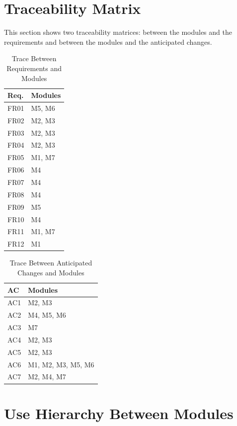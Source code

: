 \documentclass[12pt, titlepage]{article}
\begin{document}
\section{Traceability Matrix} \label{SecTM}

This section shows two traceability matrices: between the modules and the
requirements and between the modules and the anticipated changes.

\begin{table}[H]
\centering
\begin{tabular}{p{} p{}}
\toprule
\textbf{Req.} & \textbf{Modules}\\
\midrule
FR01 & M5, M6\\
FR02 & M2, M3\\
FR03 & M2, M3\\
FR04 & M2, M3\\
FR05 & M1, M7\\
FR06 & M4\\
FR07 & M4\\
FR08 & M4\\
FR09 & M5\\
FR10 & M4\\
FR11 & M1, M7\\
FR12 & M1\\
\bottomrule
\end{tabular}
\caption{Trace Between Requirements and Modules}
\label{TblRT}
\end{table}

\begin{table}[H]
\centering
\begin{tabular}{p{} p{}}
\toprule
\textbf{AC} & \textbf{Modules}\\
\midrule
AC1 & M2, M3\\
AC2 & M4, M5, M6\\
AC3 & M7\\
AC4 & M2, M3\\
AC5 & M2, M3\\
AC6 & M1, M2, M3, M5, M6\\
AC7 & M2, M4, M7\\

\bottomrule
\end{tabular}
\caption{Trace Between Anticipated Changes and Modules}
\label{TblACT}
\end{table}

\section{Use Hierarchy Between Modules} \label{SecUse}
\end{document}
